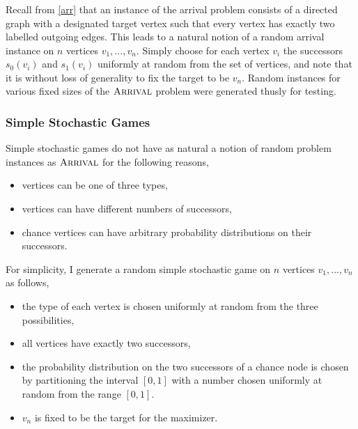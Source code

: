 \subsubsection{\arr} \label{arrRandom}
Recall from \cref{arr} that an instance of the arrival problem consists of a directed graph with
a designated target vertex such that every vertex has exactly two labelled outgoing edges.
This leads to a natural notion of a random arrival instance on $n$ vertices $v_1, ..., v_n$.
Simply choose for each vertex $v_i$ the successors $s_0(v_i)$ and $s_1(v_i)$ uniformly at random
from the set of vertices, and note that it is without loss of generality to fix the target to be $v_n$.
Random instances for various fixed sizes of the $\textsc{Arrival}$ problem were generated thusly for testing.

\subsubsection{Simple Stochastic Games} \label{ssgRandom}
Simple stochastic games do not have as natural a notion of random problem instances as $\textsc{Arrival}$ for the following reasons,
\begin{itemize}
  \item vertices can be one of three types, 
  \item vertices can have different numbers of successors,
  \item chance vertices can have arbitrary probability distributions on their successors.
\end{itemize}
For simplicity, I generate a random simple stochastic game on $n$ vertices $v_1, ..., v_n$ as follows,
\begin{itemize}
  \item the type of each vertex is chosen uniformly at random from the three possibilities,
  \item all vertices have exactly two successors,
  \item the probability distribution on the two successors of a chance node is chosen by
    partitioning the interval $[0, 1]$ with a number chosen uniformly at random from the range $[0, 1]$.
  \item $v_n$ is fixed to be the target for the maximizer.
\end{itemize}

